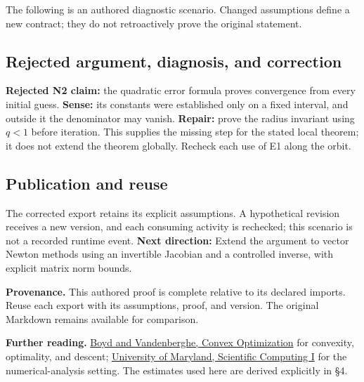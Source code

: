 \documentclass[preprint,12pt,aps,pra,showkeys,amsmath,amssymb,superscriptaddress,floatfix]{revtex4-2}
\theoremstyle{definition}
\theoremstyle{remark}
\begin{document}
The following is an authored diagnostic scenario. Changed assumptions
define a new contract; they do not retroactively prove the original
statement.

\subsection{Rejected argument, diagnosis, and correction}
\textbf{Rejected N2 claim:} the quadratic error formula proves
convergence from every initial guess. \textbf{Sense:} its constants were
established only on a fixed interval, and outside it the denominator may
vanish. \textbf{Repair:} prove the radius invariant using \(q<1\) before
iteration. This supplies the missing step for the stated local theorem;
it does not extend the theorem globally. Recheck each use of E1 along
the orbit.

\subsection{Publication and reuse}
The corrected export retains its explicit assumptions. A hypothetical
revision receives a new version, and each consuming activity is
rechecked; this scenario is not a recorded runtime event. \textbf{Next
direction:} Extend the argument to vector Newton methods using an
invertible Jacobian and a controlled inverse, with explicit matrix norm
bounds.

\par\medskip\begingroup\small\linespread{1.0}\selectfont\noindent\textbf{Provenance.} This authored proof is complete relative to its declared imports. Reuse
each export with its assumptions, proof, and version. The original
Markdown remains available for comparison.
\par\endgroup

\par\smallskip\begingroup\small\linespread{1.0}\selectfont\noindent\textbf{Further reading.} \href{https://web.stanford.edu/~boyd/cvxbook/}{Boyd and Vandenberghe,
Convex Optimization} for convexity, optimality, and descent;
\href{https://www.math.umd.edu/~mariakc/Spring2020Class.html}{University
of Maryland, Scientific Computing I} for the numerical-analysis setting.
The estimates used here are derived explicitly in §4.\par\endgroup
\end{document}

